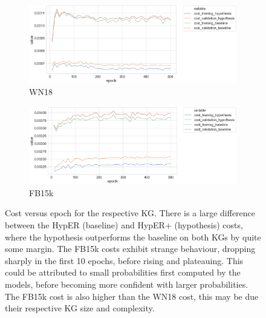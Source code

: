 \begin{figure}[H]
	\begin{subfigure}[b]{.5\linewidth}
   		\centering
    		\includegraphics[width=1.0\linewidth, height=0.6\linewidth]{WN18_Cost_Results}
		\captionsetup{justification=centering}
		\caption{WN18}
	\end{subfigure}
	\begin{subfigure}[b]{.5\linewidth}
   		\centering
		\includegraphics[width=1.0\linewidth, height=0.6\linewidth]{FB15k_Cost_Results}
		\captionsetup{justification=centering}
		\caption{FB15k}
	\end{subfigure}
	\caption{Cost versus epoch for the respective KG. There is a large difference between the HypER (baseline) and HypER+ (hypothesis) costs, where the hypothesis outperforms the baseline on both KGs by quite some margin. The FB15k costs exhibit strange behaviour, dropping sharply in the first 10 epochs, before rising and plateauing. This could be attributed to small probabilities first computed by the models, before becoming more confident with larger probabilities. The FB15k cost is also higher than the WN18 cost, this may be due their respective KG size and complexity.}
\end{figure}

